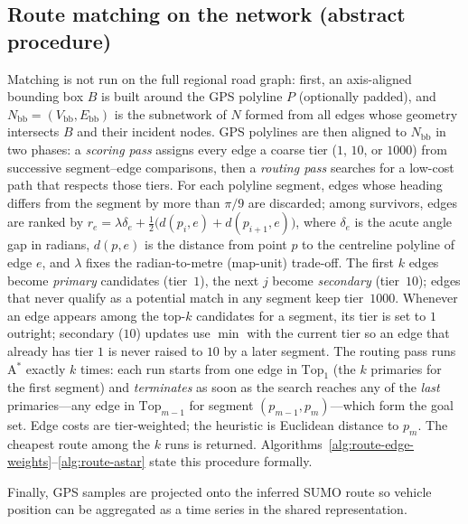 



\subsection{Route matching on the network (abstract procedure)}
Matching is not run on the full regional road graph: first, an axis-aligned bounding box $B$ is built around the GPS polyline $P$ (optionally padded), and $N_{\mathrm{bb}}=(V_{\mathrm{bb}},E_{\mathrm{bb}})$ is the subnetwork of $N$ formed from all edges whose geometry intersects $B$ and their incident nodes.
GPS polylines are then aligned to $N_{\mathrm{bb}}$ in two phases: a \emph{scoring pass} assigns every edge a coarse tier ($1$, $10$, or $1000$) from successive segment--edge comparisons, then a \emph{routing pass} searches for a low-cost path that respects those tiers.
For each polyline segment, edges whose heading differs from the segment by more than $\pi/9$ are discarded; among survivors, edges are ranked by $r_e=\lambda\delta_e+\frac{1}{2}\bigl(d(p_i,e)+d(p_{i+1},e)\bigr)$, where $\delta_e$ is the acute angle gap in radians, $d(p,e)$ is the distance from point $p$ to the centreline polyline of edge $e$, and $\lambda$ fixes the radian-to-metre (map-unit) trade-off.
The first $k$ edges become \emph{primary} candidates (tier~$1$), the next $j$ become \emph{secondary} (tier~$10$); edges that never qualify as a potential match in any segment keep tier~$1000$.
Whenever an edge appears among the top-$k$ candidates for a segment, its tier is set to $1$ outright; secondary ($10$) updates use $\min$ with the current tier so an edge that already has tier $1$ is never raised to $10$ by a later segment.
The routing pass runs A$^\ast$ exactly $k$ times: each run starts from one edge in $\mathrm{Top}_1$ (the $k$ primaries for the first segment) and \emph{terminates} as soon as the search reaches any of the \emph{last} primaries---any edge in $\mathrm{Top}_{m-1}$ for segment $(p_{m-1},p_m)$---which form the goal set. Edge costs are tier-weighted; the heuristic is Euclidean distance to $p_m$. The cheapest route among the $k$ runs is returned.
Algorithms~\ref{alg:route-edge-weights}--\ref{alg:route-astar} state this procedure formally.



Finally, GPS samples are projected onto the inferred SUMO route so vehicle position can be aggregated as a time series in the shared representation.

